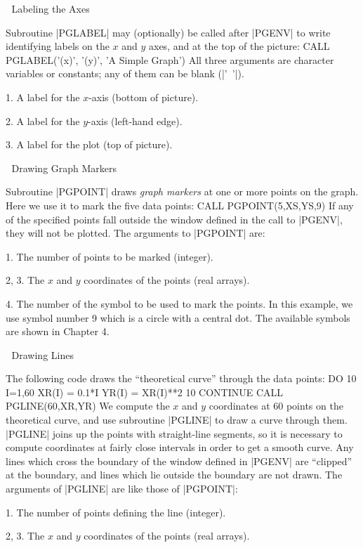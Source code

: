 
\beginsection Labeling the Axes

Subroutine |PGLABEL| may (optionally) be called after |PGENV| to write
identifying labels on the $x$ and $y$ axes, and at the top of the
picture:
\begintt
      CALL PGLABEL('(x)', '(y)', 'A Simple Graph')
\endtt
All three arguments are character variables or constants; any
of them can be blank (\hbox{|' '|}). 
\item{1.} A label for the $x$-axis (bottom of picture).
\item{2.} A label for the $y$-axis (left-hand edge).
\item{3.} A label for the plot (top of picture).


\beginsection Drawing Graph Markers

Subroutine |PGPOINT| draws {\it graph markers} at one or more
points on the graph. Here we use it to mark the five data points:
\begintt
      CALL PGPOINT(5,XS,YS,9)
\endtt
If any of the specified points fall outside the window defined in the
call to |PGENV|, they will not be plotted.  The arguments to |PGPOINT| 
are:
\item{1.} The number of points to be marked (integer).
\item{2,} 3. The $x$ and $y$ coordinates of the points (real arrays).
\item{4.} The number of the symbol to be used to mark the points. In 
this example, we use symbol number 9 which is a circle with a central 
dot. The available symbols are shown in Chapter 4.


\beginsection Drawing Lines

The following code draws the ``theoretical curve'' through the data
points:
\begintt
      DO 10 I=1,60
          XR(I) = 0.1*I
          YR(I) = XR(I)**2
   10 CONTINUE
      CALL PGLINE(60,XR,YR)
\endtt
We compute the $x$ and $y$ coordinates at 60 points on the 
theoretical curve, and use subroutine |PGLINE| to draw a curve through
them. |PGLINE| joins up the points with straight-line segments,
so it is necessary to compute coordinates at fairly close intervals in 
order to get a smooth curve. Any lines which cross the boundary of the
window defined in |PGENV| are ``clipped'' at the boundary, and lines
which lie outside the boundary are not drawn.  The arguments of |PGLINE|
are like those of |PGPOINT|:
\item{1.} The number of points defining the line (integer).
\item{2,} 3. The $x$ and $y$ coordinates of the points (real arrays).

